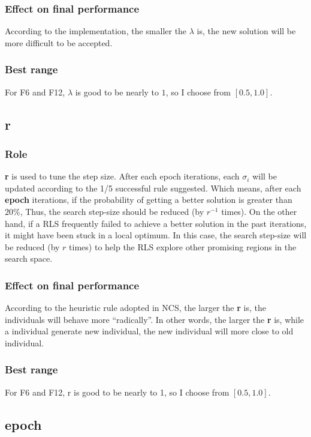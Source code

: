 \documentclass[lang=en,12pt]{elegantpaper}
\begin{document}
\subsubsection{Effect on final performance}
According to the implementation, the smaller the $\lambda$ is, the new solution will be more difficult to be accepted.

\subsubsection{Best range}
For F6 and F12, $\lambda$ is good to be nearly to $1$, so I choose from $[0.5, 1.0]$.

\subsection{r}
\subsubsection{Role}
\textbf{r} is used to tune the step size.
After each epoch iterations, each $\sigma_i$ will be updated according to the 1/5 successful rule suggested.
Which means, after each \textbf{epoch} iterations, if the probability of getting a better solution is greater than $20\%$,
Thus, the search step-size should be reduced (by $r^{-1}$ times).
On the other hand,
if a RLS frequently failed to achieve a better solution in the past iterations,
it might have been stuck in a local optimum. In this case, the search step-size will be reduced (by $r$ times) to help the RLS explore other promising regions in the search space.
\subsubsection{Effect on final performance}
According to the heuristic rule adopted in NCS, the larger the \textbf{r} is, the individuals will behave more ``radically''.
In other words, the larger the \textbf{r} is, while a individual generate new individual, the new individual will more close to old individual.
\subsubsection{Best range}
For F6 and F12, r is good to be nearly to 1, so I choose from $[0.5, 1.0]$.



\subsection{epoch}
\end{document}
